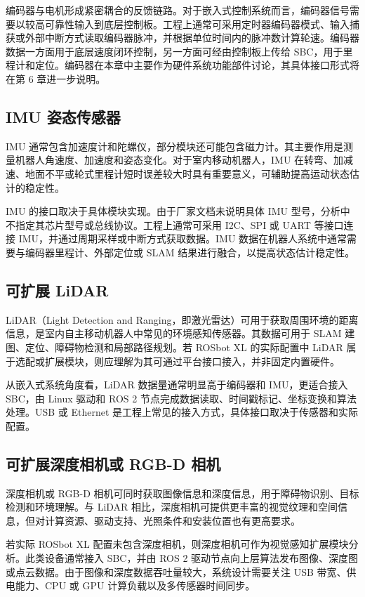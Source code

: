 \documentclass[UTF8,a4paper,12pt]{ctexrep}
\begin{document}
编码器与电机形成紧密耦合的反馈链路。对于嵌入式控制系统而言，编码器信号需要以较高可靠性输入到底层控制板。工程上通常可采用定时器编码器模式、输入捕获或外部中断方式读取编码器脉冲，并根据单位时间内的脉冲数计算轮速。编码器数据一方面用于底层速度闭环控制，另一方面可经由控制板上传给 SBC，用于里程计和定位。编码器在本章中主要作为硬件系统功能部件讨论，其具体接口形式将在第 6 章进一步说明。

\subsection{IMU 姿态传感器}

IMU 通常包含加速度计和陀螺仪，部分模块还可能包含磁力计。其主要作用是测量机器人角速度、加速度和姿态变化。对于室内移动机器人，IMU 在转弯、加减速、地面不平或轮式里程计短时误差较大时具有重要意义，可辅助提高运动状态估计的稳定性。

IMU 的接口取决于具体模块实现。由于厂家文档未说明具体 IMU 型号，分析中不指定其芯片型号或总线协议。工程上通常可采用 I2C、SPI 或 UART 等接口连接 IMU，并通过周期采样或中断方式获取数据。IMU 数据在机器人系统中通常需要与编码器里程计、外部定位或 SLAM 结果进行融合，以提高状态估计稳定性。

\subsection{可扩展 LiDAR}

LiDAR（Light Detection and Ranging，即激光雷达）可用于获取周围环境的距离信息，是室内自主移动机器人中常见的环境感知传感器。其数据可用于 SLAM 建图、定位、障碍物检测和局部路径规划。若 ROSbot XL 的实际配置中 LiDAR 属于选配或扩展模块，则应理解为其可通过平台接口接入，并非固定内置硬件。

从嵌入式系统角度看，LiDAR 数据量通常明显高于编码器和 IMU，更适合接入 SBC，由 Linux 驱动和 ROS 2 节点完成数据读取、时间戳标记、坐标变换和算法处理。USB 或 Ethernet 是工程上常见的接入方式，具体接口取决于传感器和实际配置。

\subsection{可扩展深度相机或 RGB-D 相机}

深度相机或 RGB-D 相机可同时获取图像信息和深度信息，用于障碍物识别、目标检测和环境理解。与 LiDAR 相比，深度相机可提供更丰富的视觉纹理和空间信息，但对计算资源、驱动支持、光照条件和安装位置也有更高要求。

若实际 ROSbot XL 配置未包含深度相机，则深度相机可作为视觉感知扩展模块分析。此类设备通常接入 SBC，并由 ROS 2 驱动节点向上层算法发布图像、深度图或点云数据。由于图像和深度数据吞吐量较大，系统设计需要关注 USB 带宽、供电能力、CPU 或 GPU 计算负载以及多传感器时间同步。
\end{document}
